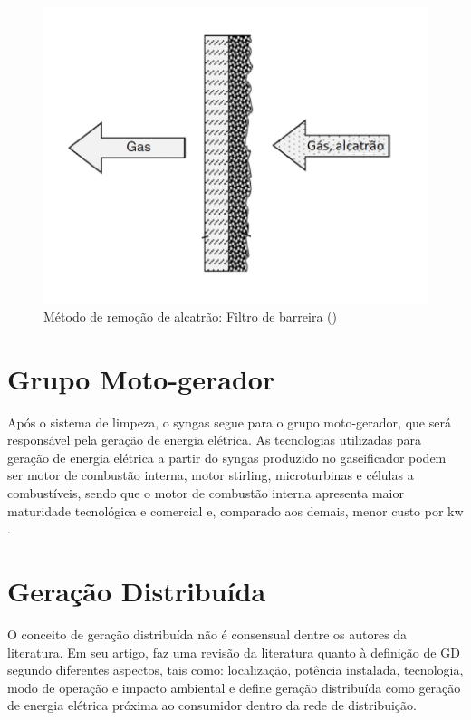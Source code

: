 \begin{figure}[!htb]
	\centering
	\includegraphics{Figuras/filtro}
	\caption{Método de remoção de alcatrão: Filtro de barreira (\cite{basu2010})}
	\label{filtro}
\end{figure}


\section{Grupo Moto-gerador}
Após o sistema de limpeza, o syngas segue para o grupo moto-gerador, que será responsável pela geração de energia elétrica. As tecnologias utilizadas para geração de energia elétrica a partir do syngas produzido no gaseificador podem ser motor de combustão interna, motor stirling, microturbinas e células a combustíveis, sendo que o motor de combustão interna apresenta maior maturidade tecnológica e comercial \cite{lora2006} e, comparado aos demais, menor custo por kw \cite{chaves2016}.


\section{Geração Distribuída}

O conceito de geração distribuída não é consensual dentre os autores da literatura. Em seu artigo, \cite{ackermann2001} faz uma revisão da literatura quanto à definição de GD segundo diferentes aspectos, tais como: localização, potência instalada, tecnologia, modo de operação e impacto ambiental e define geração distribuída como geração de energia elétrica próxima ao consumidor dentro da rede de distribuição.

